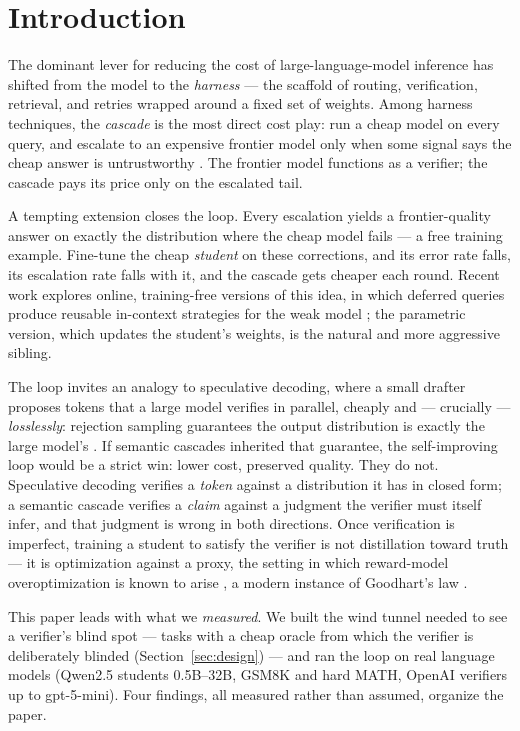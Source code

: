 \documentclass[11pt]{article}
\begin{document}
\section{Introduction}

The dominant lever for reducing the cost of large-language-model
inference has shifted from the model to the \emph{harness} --- the
scaffold of routing, verification, retrieval, and retries wrapped around
a fixed set of weights. Among harness techniques, the \emph{cascade} is
the most direct cost play: run a cheap model on every query, and
escalate to an expensive frontier model only when some signal says the
cheap answer is untrustworthy
\cite{chen2023frugalgpt,dohan2022cascades,aggarwal2023automix}.
The frontier model functions as a verifier; the cascade pays its price
only on the escalated tail.

A tempting extension closes the loop. Every escalation yields a
frontier-quality answer on exactly the distribution where the cheap
model fails --- a free training example. Fine-tune the cheap
\emph{student} on these corrections, and its error rate falls, its
escalation rate falls with it, and the cascade gets cheaper each round.
Recent work explores online, training-free versions of this idea, in
which deferred queries produce reusable in-context strategies for the
weak model \cite{intercascade2025,sarukkai2025deferral}; the
parametric version, which updates the student's weights, is the natural
and more aggressive sibling.

The loop invites an analogy to speculative decoding, where a small
drafter proposes tokens that a large model verifies in parallel, cheaply
and --- crucially --- \emph{losslessly}: rejection sampling guarantees
the output distribution is exactly the large model's
\cite{leviathan2023speculative,chen2023speculative}. If semantic
cascades inherited that guarantee, the self-improving loop would be a
strict win: lower cost, preserved quality. They do not. Speculative
decoding verifies a \emph{token} against a distribution it has in closed
form; a semantic cascade verifies a \emph{claim} against a judgment the
verifier must itself infer, and that judgment is wrong in both
directions. Once verification is imperfect, training a student to
satisfy the verifier is not distillation toward truth --- it is
optimization against a proxy, the setting in which reward-model
overoptimization is known to arise
\cite{gao2023scaling,skalse2022reward}, a modern instance of
Goodhart's law \cite{manheim2018goodhart}.

This paper leads with what we \emph{measured}. We built the wind tunnel
needed to see a verifier's blind spot --- tasks with a cheap oracle from
which the verifier is deliberately blinded (Section~\ref{sec:design}) ---
and ran the loop on real language models (Qwen2.5 students 0.5B--32B,
GSM8K and hard MATH, OpenAI verifiers up to gpt-5-mini). Four findings,
all measured rather than assumed, organize the paper.
\end{document}
